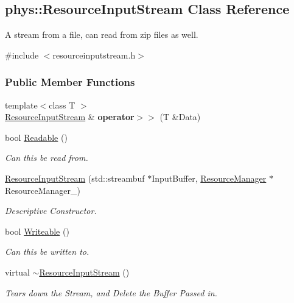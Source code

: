 \hypertarget{classphys_1_1ResourceInputStream}{
\subsection{phys::ResourceInputStream Class Reference}
\label{classphys_1_1ResourceInputStream}
}


A stream from a file, can read from zip files as well.  




{\ttfamily \#include $<$resourceinputstream.h$>$}

\subsubsection*{Public Member Functions}
\begin{DoxyCompactItemize}
\item 
\hypertarget{classphys_1_1ResourceInputStream_a40a93720c3a4a9fb8c2c082c00574912}{
{\footnotesize template$<$class T $>$ }\\\hyperlink{classphys_1_1ResourceInputStream}{ResourceInputStream} \& {\bfseries operator$>$$>$} (T \&Data)}
\label{classphys_1_1ResourceInputStream_a40a93720c3a4a9fb8c2c082c00574912}

\item 
bool \hyperlink{classphys_1_1ResourceInputStream_a4900f77dd452c2a2ddf47a76d36d85c3}{Readable} ()
\begin{DoxyCompactList}\small\item\em Can this be read from. \item\end{DoxyCompactList}\item 
\hyperlink{classphys_1_1ResourceInputStream_a890b739ac7f1c68108dc29f6887d2fa2}{ResourceInputStream} (std::streambuf $\ast$InputBuffer, \hyperlink{classphys_1_1ResourceManager}{ResourceManager} $\ast$ResourceManager\_\-)
\begin{DoxyCompactList}\small\item\em Descriptive Constructor. \item\end{DoxyCompactList}\item 
bool \hyperlink{classphys_1_1ResourceInputStream_a6e7619bf3efd3b344fab92d326385009}{Writeable} ()
\begin{DoxyCompactList}\small\item\em Can this be written to. \item\end{DoxyCompactList}\item 
\hypertarget{classphys_1_1ResourceInputStream_a03b9d40f0b006edd6daf25e93084f80d}{
virtual \hyperlink{classphys_1_1ResourceInputStream_a03b9d40f0b006edd6daf25e93084f80d}{$\sim$ResourceInputStream} ()}
\label{classphys_1_1ResourceInputStream_a03b9d40f0b006edd6daf25e93084f80d}

\begin{DoxyCompactList}\small\item\em Tears down the Stream, and Delete the Buffer Passed in. \item\end{DoxyCompactList}\end{DoxyCompactItemize}


